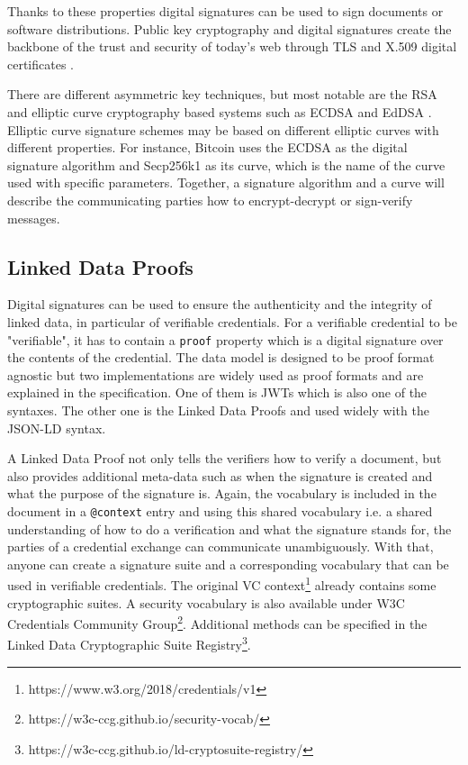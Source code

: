 Thanks to these properties digital signatures can be used to sign documents or software distributions. Public key cryptography and digital signatures create the backbone of the trust and security of today's web through \acrfull{TLS} \parencite{rfc8446} and X.509 digital certificates \parencite{rfc5280}.

There are different asymmetric key techniques, but most notable are the RSA \parencite{rivest1978method} and elliptic curve cryptography based systems such as \acrshort{ECDSA} \parencite{johnson2001elliptic} and \acrshort{EdDSA} \parencite{rfc8032}. Elliptic curve signature schemes may be based on different elliptic curves with different properties. For instance, Bitcoin uses the \acrshort{ECDSA} as the digital signature algorithm and Secp256k1 as its curve, which is the name of the curve used with specific parameters. Together, a signature algorithm and a curve will describe the communicating parties how to encrypt-decrypt or sign-verify messages.   

\subsection{Linked Data Proofs}

Digital signatures can be used to ensure the authenticity and the integrity of linked data, in particular of verifiable credentials. For a verifiable credential to be "verifiable", it has to contain a \lstinline{proof} property which is a digital signature over the contents of the credential. The data model is designed to be proof format agnostic but two implementations are widely used as proof formats and are explained in the specification. One of them is \acrshort{JWT}s which is also one of the syntaxes. The other one is the Linked Data Proofs \parencite{ldproofs} and used widely with the \acrshort{JSON-LD} syntax. 

A Linked Data Proof not only tells the verifiers how to verify a document, but also provides additional meta-data such as when the signature is created and what the purpose of the signature is. Again, the vocabulary is included in the document in a \lstinline{@context} entry and using this shared vocabulary i.e. a shared understanding of how to do a verification and what the signature stands for, the parties of a credential exchange can communicate unambiguously. With that, anyone can create a signature suite and a corresponding vocabulary that can be used in verifiable credentials. The original \acrshort{VC} context\footnote{https://www.w3.org/2018/credentials/v1} already contains some cryptographic suites. A security vocabulary is also available under W3C Credentials Community Group\footnote{https://w3c-ccg.github.io/security-vocab/}. Additional methods can be specified in the Linked Data Cryptographic Suite Registry\footnote{https://w3c-ccg.github.io/ld-cryptosuite-registry/}.

